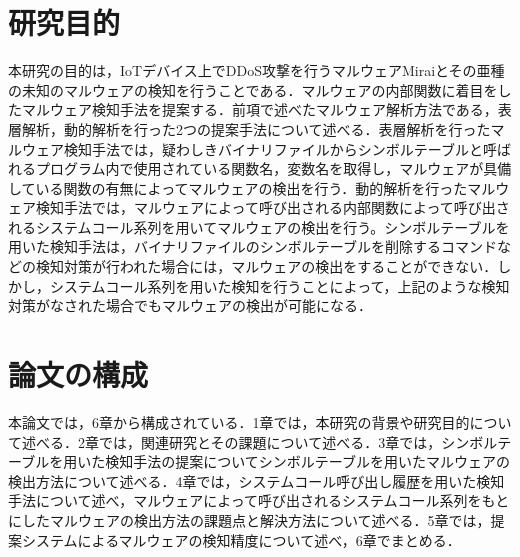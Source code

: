 \section{研究目的}
本研究の目的は，IoTデバイス上でDDoS攻撃を行うマルウェアMiraiとその亜種の未知のマルウェアの検知を行うことである．マルウェアの内部関数に着目をしたマルウェア検知手法を提案する．前項で述べたマルウェア解析方法である，表層解析，動的解析を行った2つの提案手法について述べる．表層解析を行ったマルウェア検知手法では，疑わしきバイナリファイルからシンボルテーブルと呼ばれるプログラム内で使用されている関数名，変数名を取得し，マルウェアが具備している関数の有無によってマルウェアの検出を行う．動的解析を行ったマルウェア検知手法では，マルウェアによって呼び出される内部関数によって呼び出されるシステムコール系列を用いてマルウェアの検出を行う。シンボルテーブルを用いた検知手法は，バイナリファイルのシンボルテーブルを削除するコマンドなどの検知対策が行われた場合には，マルウェアの検出をすることができない．しかし，システムコール系列を用いた検知を行うことによって，上記のような検知対策がなされた場合でもマルウェアの検出が可能になる．
　
\section{論文の構成}
本論文では，6章から構成されている．1章では，本研究の背景や研究目的について述べる．2章では，関連研究とその課題について述べる．3章では，シンボルテーブルを用いた検知手法の提案についてシンボルテーブルを用いたマルウェアの検出方法について述べる．4章では，システムコール呼び出し履歴を用いた検知手法について述べ，マルウェアによって呼び出されるシステムコール系列をもとにしたマルウェアの検出方法の課題点と解決方法について述べる．5章では，提案システムによるマルウェアの検知精度について述べ，6章でまとめる．%